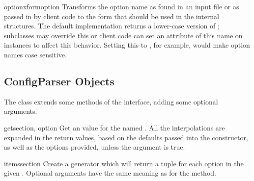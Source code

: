 \begin{methoddesc}{optionxform}{option}
Transforms the option name  as found in an input file or
as passed in by  client code to the form that should be used in the
internal structures.  The default implementation returns a lower-case
version of ; subclasses may override this or client code
can set an attribute of this name on instances to affect this
behavior.  Setting this to , for example, would make
option names case sensitive.
\end{methoddesc}


\subsection{ConfigParser Objects \label{ConfigParser-objects}}

The  class extends some methods of the
 interface, adding some optional arguments.

\begin{methoddesc}{get}{section, option}
Get an  value for the named .  All the
\character{\%} interpolations are expanded in the return values, based
on the defaults passed into the constructor, as well as the options
 provided, unless the  argument is true.
\end{methoddesc}

\begin{methoddesc}{items}{section}
Create a generator which will return a tuple  for
each option in the given . Optional arguments have the
same meaning as for the  method.
\end{methoddesc}
